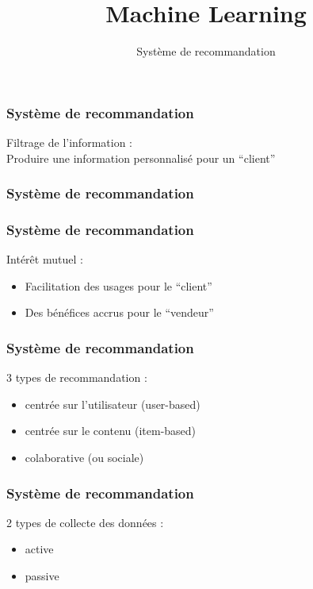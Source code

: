 \documentclass{formation}
\title{Machine Learning}
\subtitle{Système de recommandation}
\begin{document}
\maketitle

\begin{frame}
  \frametitle{Système de recommandation}
  Filtrage de l'information : \\
  \newline
  Produire une information personnalisé pour un ``client''
\end{frame}

\begin{frame}
  \frametitle{Système de recommandation}
  \begin{minipage}[l]{0.33\linewidth}
  \end{minipage}\hfill
  \begin{minipage}[l]{0.33\linewidth}
  \end{minipage}\hfill
  \begin{minipage}[l]{0.33\linewidth}
  \end{minipage}\hfill
\end{frame}

\begin{frame}
  \frametitle{Système de recommandation}
  Intérêt mutuel :
  \begin{itemize}[<+->]
  \item Facilitation des usages pour le ``client''
  \item Des bénéfices accrus pour le ``vendeur''
  \end{itemize}
\end{frame}

\begin{frame}
  \frametitle{Système de recommandation}
  3 types de recommandation :
  \begin{itemize}[<+->]
  \item centrée sur l'utilisateur (user-based)
  \item centrée sur le contenu (item-based)
  \item colaborative (ou sociale)
  \end{itemize}
\end{frame}

\begin{frame}
  \frametitle{Système de recommandation}
  2 types de collecte des données : 
  \begin{itemize}[<+->]
  \item active
  \item passive
  \end{itemize}
\end{frame}
\end{document}
